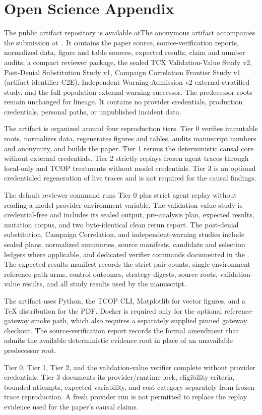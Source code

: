 \section{Open Science Appendix}

\ifdefined\TCOPPreprint The public artifact repository is available at\else The anonymous artifact accompanies the submission at\fi\ \TCOPArtifactLink{}. It contains the paper source, source-verification reports, normalized data, figure and table sources, expected results, claim and number audits, a compact reviewer package, the sealed TCX Validation-Value Study v2, Post-Denial Substitution Study v1, Campaign Correlation Frontier Study v1 (artifact identifier C2E), Independent Warning Admission v2 external-stratified study, and the full-population external-warning successor. The predecessor roots remain unchanged for lineage. It contains no provider credentials, production credentials, personal paths, or unpublished incident data.

The artifact is organized around four reproduction tiers. Tier 0 verifies immutable roots, normalizes data, regenerates figures and tables, audits manuscript numbers and anonymity, and builds the paper. Tier 1 reruns the deterministic causal core without external credentials. Tier 2 strictly replays frozen agent traces through local-only and TCOP treatments without model credentials. Tier 3 is an optional credentialed regeneration of live traces and is not required for the causal findings.

The default reviewer command runs Tier 0 plus strict agent replay without reading a model-provider environment variable. The validation-value study is credential-free and includes its sealed output, pre-analysis plan, expected results, mutation corpus, and two byte-identical clean rerun report. The post-denial substitution, Campaign Correlation, and independent-warning studies include sealed plans, normalized summaries, source manifests, candidate and selection ledgers where applicable, and dedicated verifier commands documented in the \TCOPArtifactDescription{}. The expected-results manifest records the strict-pair counts, single-environment reference-path arms, control outcomes, strategy digests, source roots, validation-value results, and all study results used by the manuscript.

The artifact uses Python, the TCOP CLI, Matplotlib for vector figures, and a TeX distribution for the PDF. Docker is required only for the optional reference-gateway smoke path, which also requires a separately supplied pinned gateway checkout. The source-verification report records the formal amendment that admits the available deterministic evidence root in place of an unavailable predecessor root.

Tier 0, Tier 1, Tier 2, and the validation-value verifier complete without provider credentials. Tier 3 documents its provider/runtime lock, eligibility criteria, bounded attempts, expected variability, and cost category separately from frozen-trace reproduction. A fresh provider run is not permitted to replace the replay evidence used for the paper's causal claims.
